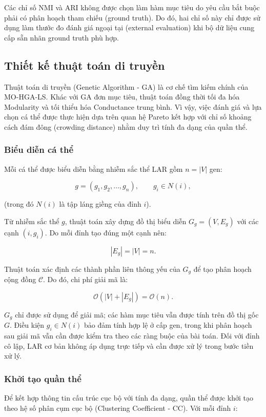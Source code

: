 \documentclass[14pt,a4paper]{extarticle}
\begin{document}
Các chỉ số NMI và ARI không được chọn làm hàm mục tiêu do yêu cầu bắt buộc phải có phân hoạch tham chiếu (ground truth). Do đó, hai chỉ số này chỉ được sử dụng làm thước đo đánh giá ngoại tại (external evaluation) khi bộ dữ liệu cung cấp sẵn nhãn ground truth phù hợp.

\subsection{Thiết kế thuật toán di truyền}

Thuật toán di truyền (Genetic Algorithm - GA) là cơ chế tìm kiếm chính của MO-HGA-LS. Khác với GA đơn mục tiêu, thuật toán đồng thời tối đa hóa Modularity và tối thiểu hóa Conductance trung bình. Vì vậy, việc đánh giá và lựa chọn cá thể được thực hiện dựa trên quan hệ Pareto kết hợp với chỉ số khoảng cách đám đông (crowding distance) nhằm duy trì tính đa dạng của quần thể.

\subsubsection{Biểu diễn cá thể}

Mỗi cá thể được biểu diễn bằng nhiễm sắc thể LAR gồm $n=|V|$ gen:

\[
g=(g_1,g_2,\ldots,g_n),
\qquad
g_i\in N(i),
\]

(trong đó $N(i)$ là tập láng giềng của đỉnh $i$). 

Từ nhiễm sắc thể $g$, thuật toán xây dựng đồ thị biểu diễn $G_g=(V,E_g)$ với các cạnh $(i,g_i)$. Do mỗi đỉnh tạo đúng một cạnh nên:

\[
|E_g|=|V|=n.
\]

Thuật toán xác định các thành phần liên thông yếu của $G_g$ để tạo phân hoạch cộng đồng $\mathcal C$. Do đó, chi phí giải mã là:

\[
\mathcal O(|V|+|E_g|)=\mathcal O(n).
\]

$G_g$ chỉ được sử dụng để giải mã; các hàm mục tiêu vẫn được tính trên đồ thị gốc $G$. Điều kiện $g_i\in N(i)$ bảo đảm tính hợp lệ ở cấp gen, trong khi phân hoạch sau giải mã vẫn cần được kiểm tra theo các ràng buộc của bài toán. Đối với đỉnh cô lập, LAR cơ bản không áp dụng trực tiếp và cần được xử lý trong bước tiền xử lý.

\subsubsection{Khởi tạo quần thể}

Để kết hợp thông tin cấu trúc cục bộ với tính đa dạng, quần thể được khởi tạo theo hệ số phân cụm cục bộ (Clustering Coefficient - CC). Với mỗi đỉnh $i$:
\end{document}
